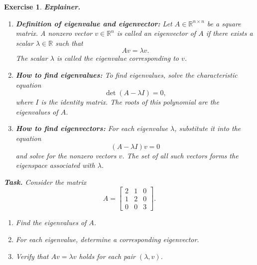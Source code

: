 \documentclass[12pt,a4paper]{article}
\newtheorem{exercise}{Exercise}[section]
\begin{document}
\begin{exercise}
\textbf{Explainer.}

\begin{enumerate}
  \item \textbf{Definition of eigenvalue and eigenvector:}  
  Let $A \in \mathbb{R}^{n \times n}$ be a square matrix. A nonzero vector $v \in \mathbb{R}^n$ is called an \emph{eigenvector} of $A$ if there exists a scalar $\lambda \in \mathbb{R}$ such that
  \[
  Av = \lambda v.
  \]
  The scalar $\lambda$ is called the \emph{eigenvalue} corresponding to $v$.

  \item \textbf{How to find eigenvalues:}  
  To find eigenvalues, solve the \emph{characteristic equation}
  \[
  \det(A - \lambda I) = 0,
  \]
  where $I$ is the identity matrix. The roots of this polynomial are the eigenvalues of $A$.

  \item \textbf{How to find eigenvectors:}  
  For each eigenvalue $\lambda$, substitute it into the equation
  \[
  (A - \lambda I)v = 0
  \]
  and solve for the nonzero vectors $v$. The set of all such vectors forms the eigenspace associated with $\lambda$.
\end{enumerate}

\bigskip

\textbf{Task.}  
Consider the matrix
\[
A = \begin{bmatrix}
2 & 1 & 0 \\
1 & 2 & 0 \\
0 & 0 & 3
\end{bmatrix}.
\]
\begin{enumerate}[label=(\alph*)]
    \item Find the eigenvalues of $A$.  
    \item For each eigenvalue, determine a corresponding eigenvector.  
    \item Verify that $Av = \lambda v$ holds for each pair $(\lambda, v)$.  
\end{enumerate}
\end{exercise}
\end{document}
